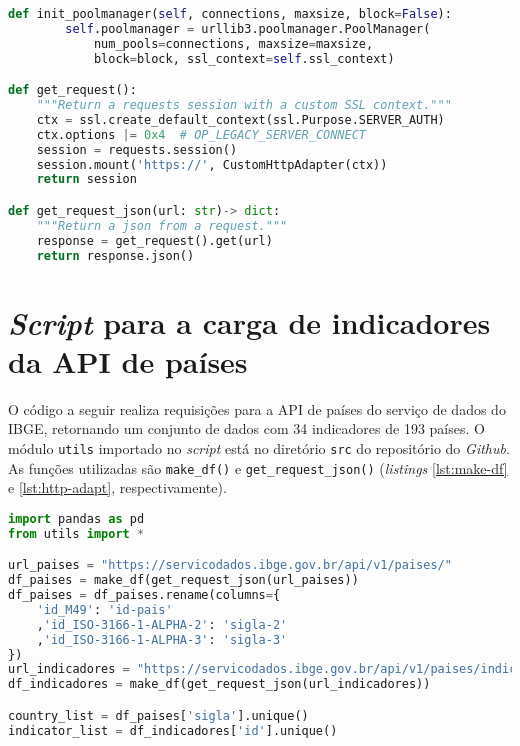 \begin{apendicesenv}
\begin{lstlisting}[label={lst:http-adapt},language=Python, caption=Algoritmo de transformação de \textit{string} JSON para um objeto do tipo \textit{pandas.DataFrame}.]
    def init_poolmanager(self, connections, maxsize, block=False):
        self.poolmanager = urllib3.poolmanager.PoolManager(
            num_pools=connections, maxsize=maxsize,
            block=block, ssl_context=self.ssl_context)

def get_request():
    """Return a requests session with a custom SSL context."""
    ctx = ssl.create_default_context(ssl.Purpose.SERVER_AUTH)
    ctx.options |= 0x4  # OP_LEGACY_SERVER_CONNECT
    session = requests.session()
    session.mount('https://', CustomHttpAdapter(ctx))
    return session

def get_request_json(url: str)-> dict:
    """Return a json from a request."""
    response = get_request().get(url)
    return response.json()
\end{lstlisting}

\section{\textit{Script} para a carga de indicadores da API de países}

    O código a seguir realiza requisições para a API de países do serviço de dados do IBGE, retornando um conjunto de dados com 34 indicadores de 193 países. O módulo \verb|utils| importado no \textit{script} está no diretório \verb|src| do repositório do \textit{Github}. As funções utilizadas são \verb|make_df()| e \verb|get_request_json()| (\textit{listings} \ref{lst:make-df} e \ref{lst:http-adapt}, respectivamente).
    
\begin{lstlisting}[label={lst:api-paises},language=Python, caption=\textit{Script} de carga dos indicadores da API de países.]
import pandas as pd
from utils import *

url_paises = "https://servicodados.ibge.gov.br/api/v1/paises/"
df_paises = make_df(get_request_json(url_paises))
df_paises = df_paises.rename(columns={
    'id_M49': 'id-pais'
    ,'id_ISO-3166-1-ALPHA-2': 'sigla-2'
    ,'id_ISO-3166-1-ALPHA-3': 'sigla-3'
})
url_indicadores = "https://servicodados.ibge.gov.br/api/v1/paises/indicadores/"
df_indicadores = make_df(get_request_json(url_indicadores))

country_list = df_paises['sigla'].unique()
indicator_list = df_indicadores['id'].unique()


\end{lstlisting}
\end{apendicesenv}
